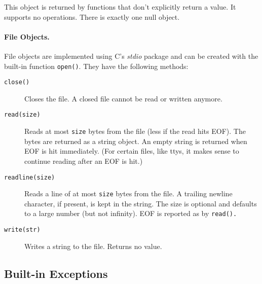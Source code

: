 This object is returned by functions that don't explicitly return a
value.
It supports no operations.
There is exactly one null object.

\paragraph{File Objects.}

File objects are implemented using C's
{\em stdio}
package and can be created with the built-in function
{\tt open()}.
They have the following methods:
\begin{description}
\item[{\tt close()}]
Closes the file.
A closed file cannot be read or written anymore.
\item[{\tt read(size)}]
Reads at most
{\tt size}
bytes from the file (less if the read hits EOF).
The bytes are returned as a string object.
An empty string is returned when EOF is hit immediately.
(For certain files, like ttys, it makes sense to continue reading after
an EOF is hit.)
\item[{\tt readline(size)}]
Reads a line of at most
{\tt size}
bytes from the file.
A trailing newline character, if present, is kept in the string.
The size is optional and defaults to a large number (but not infinity).
EOF is reported as by
{\tt read().}
\item[{\tt write(str)}]
Writes a string to the file.
Returns no value.
\end{description}

\subsection{Built-in Exceptions}

